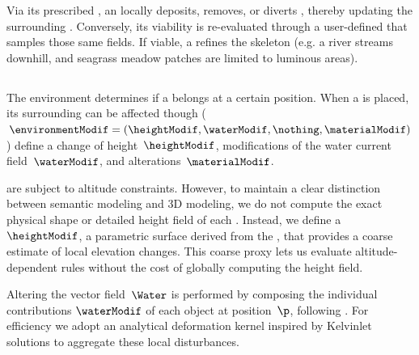 Via its prescribed , an  locally deposits, removes, or diverts , thereby updating the surrounding .  Conversely, its viability is re-evaluated through a user-defined  that samples those same fields.  If viable, a  refines the skeleton (e.g. a river streams downhill, and seagrass meadow patches are limited to luminous areas).



\subsection{}

The environment determines if a  belongs at a certain position. 
When a  is placed, its surrounding  can be affected though  ($\,\environmentModif = (\heightModif, \waterModif, \nothing, \materialModif)\,$) define a change of height~$\heightModif$, modifications of the water current field~$\waterModif$, and  alterations~$\materialModif$.

 are subject to altitude constraints. 
However, to maintain a clear distinction between semantic modeling and 3D modeling, we do not compute the exact physical shape or detailed height field of each . 
Instead, we define a ~$\heightModif$, a parametric surface derived from the , that provides a coarse estimate of local elevation changes. This coarse proxy lets us evaluate altitude-dependent rules without the cost of globally computing the height field.

Altering the vector field~$\Water$ is performed by composing the individual contributions $\waterModif$ of each object at position~$\p$, following \citep{Wejchert1991}. For efficiency we adopt an analytical deformation kernel inspired by Kelvinlet solutions \cite{DeGoes2017} to aggregate these local disturbances.

